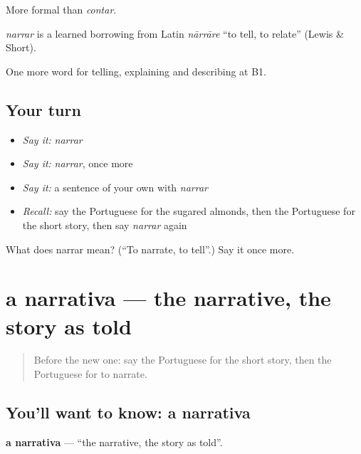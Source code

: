 More formal than \emph{contar}.

\begin{cousinweb}
\emph{narrar} is a learned borrowing from Latin \emph{nārrāre} \textquotedblleft{}to tell, to relate\textquotedblright{} (Lewis \& Short).
\end{cousinweb}

\begin{grammarlens}[title={What you've built}]
One more word for telling, explaining and describing at B1.
\end{grammarlens}

\subsection*{Your turn}
\begin{itemize}
\raggedright
  \item \emph{Say it:} \emph{narrar}
  \item \emph{Say it:} \emph{narrar}, once more
  \item \emph{Say it:} a sentence of your own with \emph{narrar}
  \item \emph{Recall:} say the Portuguese for the sugared almonds, then the Portuguese for the short story, then say \emph{narrar} again
\end{itemize}

\begin{tcolorbox}[breakable,colback=teal!4,colframe=teal!35!black,title={Before you move on}]
What does narrar mean? (\textquotedblleft{}To narrate, to tell\textquotedblright{}.) Say it once more.
\end{tcolorbox}
\section[a narrativa]{a narrativa — the narrative, the story as told}

\label{lesson:PT-C324-narrativa}



\begin{quote}
Before the new one: say the Portuguese for the short story, then the Portuguese for to narrate.
\end{quote}

\subsection*{You'll want to know: a narrativa}
\textbf{a narrativa} — \textquotedblleft{}the narrative, the story as told\textquotedblright{}.

